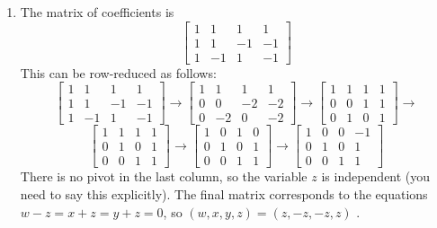 \documentclass{amsart}
\newcommand{\xra}{\xrightarrow}
\renewcommand{\:}       {\colon}
\newcommand{\mks}[1]    {}
\newcommand{\mk}        {}
\begin{document}
\begin{enumerate}
 \item %
  The matrix of coefficients is
  \[ \left[\begin{array}{cccc}
      1 & 1 & 1 & 1 \\ 1 & 1 & -1 & -1 \\ 1 & -1 & 1 & -1
     \end{array}\right] \mk
  \]
  This can be row-reduced as follows:
  \[ \left[\begin{array}{cccc}
      1 & 1 & 1 & 1 \\ 1 & 1 & -1 & -1 \\ 1 & -1 & 1 & -1
     \end{array}\right] \xra{}
     \left[\begin{array}{cccc}
      1 & 1 & 1 & 1 \\ 0 & 0 & -2 & -2 \\ 0 & -2 & 0 & -2
     \end{array}\right] \xra{}
     \left[\begin{array}{cccc}
      1 & 1 & 1 & 1 \\ 0 & 0 & 1 & 1 \\ 0 & 1 & 0 & 1
     \end{array}\right] \xra{}
  \]
  \[ \left[\begin{array}{cccc}
      1 & 1 & 1 & 1 \\ 0 & 1 & 0 & 1 \\ 0 & 0 & 1 & 1
     \end{array}\right] \xra{}
     \left[\begin{array}{cccc}
      1 & 0 & 1 & 0 \\ 0 & 1 & 0 & 1 \\ 0 & 0 & 1 & 1
     \end{array}\right] \xra{}
     \left[\begin{array}{cccc}
      1 & 0 & 0 & -1 \\ 0 & 1 & 0 & 1 \\ 0 & 0 & 1 & 1
     \end{array}\right] \mks{2M 2A}
  \]
  There is no pivot in the last column, so the variable $z$ is
  independent \mk(you need to say this explicitly).  The final matrix
  corresponds to the equations $w-z=x+z=y+z=0$, so
  $(w,x,y,z)=(z,-z,-z,z)$ \mk. 


\end{enumerate}
\end{document}
